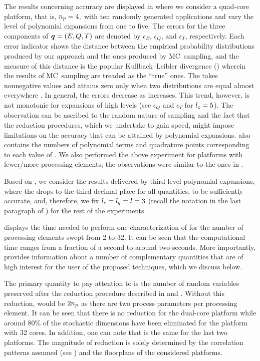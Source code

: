 The results concerning accuracy are displayed in  where we
consider a quad-core platform, that is, ${n_{p}} = 4$, with ten randomly generated
applications and vary the level of polynomial expansions \lc from one to five.
The errors for the three components of $\boldsymbol{q} = (E, Q, T)$ are denoted by
$\epsilon_E$, $\epsilon_Q$, and $\epsilon_T$, respectively. Each error indicator
shows the distance between the empirical probability distributions produced by
our approach and the ones produced by \ac{MC}\ sampling, and the measure of this
distance is the popular Kullback--Leibler divergence () wherein the
results of \ac{MC}\ sampling are treaded as the ``true'' ones. The 
takes nonnegative values and attains zero only when two distributions are equal
almost everywhere \cite{durrett2010}. In general, the errors decrease as \lc
increases. This trend, however, is not monotonic for expansions of high levels
(see $\epsilon_Q$ and $\epsilon_T$ for ${l_{c}} = 5$). The observation can be
ascribed to the random nature of sampling and the fact that the reduction
procedures, which we undertake to gain speed, might impose limitations on the
accuracy that can be attained by polynomial expansions.  also
contains the numbers of polynomial terms \nc and quadrature points \nq
corresponding to each value of \lc. We also performed the above experiment for
platforms with fewer/more processing elements; the observations were similar to
the ones in .

Based on , we consider the results delivered by third-level
polynomial expansions, where the  drops to the third decimal place for
all quantities, to be sufficiently accurate, and, therefore, we fix ${l_{c}} = {l_{q}} =
l = 3$ (recall the notation in the last paragraph of
) for the rest of the experiments.

 displays the time needed to perform one characterization of \vq for
the number of processing elements \np swept from 2 to 32. It can be seen that
the computational time ranges from a fraction of a second to around two seconds.
More importantly,  provides information about a number of
complementary quantities that are of high interest for the user of the proposed
techniques, which we discuss below.

The primary quantity to pay attention to is the number of random variables \nz
preserved after the reduction procedure described in  and
. Without this reduction, \nz would be $2 {n_{p}}$ as
there are two process parameters per processing element. It can be seen that
there is no reduction for the dual-core platform while around 80\% of the
stochastic dimensions have been eliminated for the platform with 32 cores. In
addition, one can note that \nz is the same for the last two platforms. The
magnitude of reduction is solely determined by the correlation patterns assumed
(see ) and the floorplans of the considered platforms.

